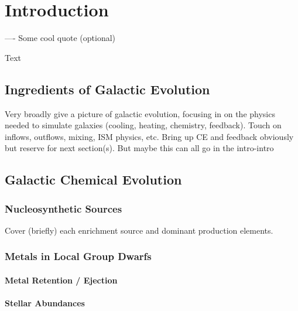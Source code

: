 \chapter[Introduction]{Introduction}
\label{ch:intro}
\vspace{-16pt} \begin{chapquote}{----} \singlespacing Some cool quote (optional)
\end{chapquote} \vspace{-8pt}
\noindent\makebox[\linewidth]{\rule{0.5\textwidth}{0.5pt}} \vspace{1pt}


%

Text

\section{Ingredients of Galactic Evolution}

Very broadly give a picture of galactic evolution, focusing in on the physics needed to simulate galaxies (cooling, heating, chemistry, feedback). Touch on inflows, outflows, mixing, ISM physics, etc. Bring up CE and feedback obviously but reserve for next section(s). But maybe this can all go in the intro-intro

\section{Galactic Chemical Evolution}
\label{sec:CE}

\subsection{Nucleosynthetic Sources}

Cover (briefly) each enrichment source and dominant production elements. 


\subsection{Metals in Local Group Dwarfs}

\subsubsection{Metal Retention / Ejection}

\subsubsection{Stellar Abundances}


